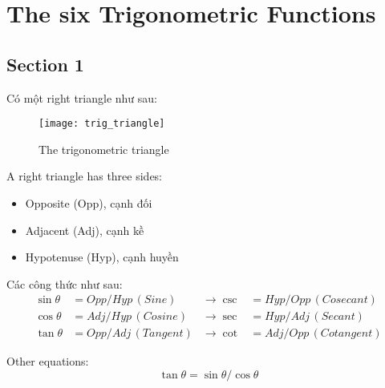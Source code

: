 \chapter{The six Trigonometric Functions}

\section{Section 1}

Có một right triangle như sau:

\begin{figure}[ht]
  \centering
  \texttt{[image: trig\_triangle]}
  \caption{The trigonometric triangle}
\end{figure}

A right triangle has three sides:
\begin{itemize}
  \item Opposite (Opp), cạnh đối
  \item Adjacent (Adj), cạnh kề
  \item Hypotenuse (Hyp), cạnh huyền
\end{itemize}

Các công thức như sau:
\begin{align*}  
\sin\theta &= Opp/Hyp\, (Sine) & \longrightarrow \csc &= Hyp/Opp\, (Cosecant)\\
\cos\theta &= Adj/Hyp\, (Cosine) & \longrightarrow \sec &= Hyp/Adj\, (Secant)\\
\tan\theta &= Opp/Adj\, (Tangent) & \longrightarrow \cot &= Adj/Opp\, (Cotangent)
\end{align*}

Other equations:$$\tan\theta = \sin\theta / \cos\theta$$